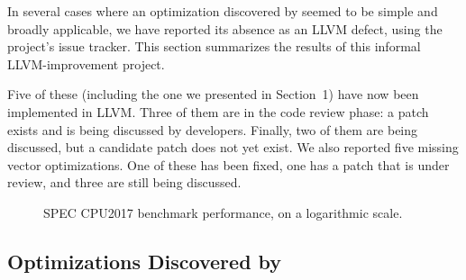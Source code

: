 In several cases where an optimization discovered by \minotaur{} seemed to
be simple and broadly applicable, we have reported its absence as an
LLVM defect, using the project's issue tracker.
%
This section summarizes the results of this informal LLVM-improvement
project.



%
Five of these (including the one we presented in Section~1) have now
been implemented in LLVM\@.
%
Three of them are in the code review phase: a patch exists and is
being discussed by developers.
%
Finally, two of them are being discussed, but a candidate patch does
not yet exist.
We also reported five missing vector optimizations.
%
One of these has been fixed, one has a patch that is under review, and
three are still being discussed.

\begin{figure}[tbp]
  \centering
  \hfill
  \caption{SPEC CPU2017 benchmark performance, on a logarithmic scale.}
  \label{fig:spec}
\end{figure}

\subsection{Optimizations Discovered by \minotaur}
\label{sec:examples}

